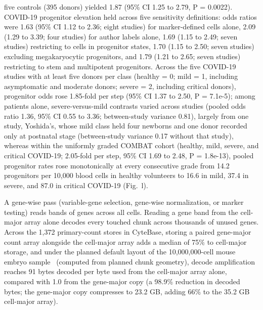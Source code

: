 five controls (395 donors) yielded 1.87 (95\% CI 1.25 to 2.79, P = 0.0022). COVID-19 progenitor elevation held across five sensitivity definitions: odds ratios were 1.63 (95\% CI 1.12 to 2.36; eight studies) for marker-defined cells alone, 2.09 (1.29 to 3.39; four studies) for author labels alone, 1.69 (1.15 to 2.49; seven studies) restricting to cells in progenitor states, 1.70 (1.15 to 2.50; seven studies) excluding megakaryocytic progenitors, and 1.79 (1.21 to 2.65; seven studies) restricting to stem and multipotent progenitors. Across the five COVID-19 studies with at least five donors per class (healthy = 0; mild = 1, including asymptomatic and moderate donors; severe = 2, including critical donors), progenitor odds rose 1.85-fold per step (95\% CI 1.37 to 2.50, P = 7.1e-5); among patients alone, severe-versus-mild contrasts varied across studies (pooled odds ratio 1.36, 95\% CI 0.55 to 3.36; between-study variance 0.81), largely from one study, Yoshida's, whose mild class held four newborns and one donor recorded only at postnatal stage (between-study variance 0.17 without that study), whereas within the uniformly graded COMBAT cohort (healthy, mild, severe, and critical COVID-19; 2.05-fold per step, 95\% CI 1.69 to 2.48, P = 1.8e-13), pooled progenitor rates rose monotonically at every consecutive grade from 14.2 progenitors per 10,000 blood cells in healthy volunteers to 16.6 in mild, 37.4 in severe, and 87.0 in critical COVID-19 (Fig.~l).

\label{note:Count layouts and read requests}

A gene-wise pass (variable-gene selection, gene-wise normalization, or marker testing) reads bands of genes across all cells. Reading a gene band from the cell-major array alone decodes every touched chunk across thousands of unused genes. Across the 1,372 primary-count stores in CyteBase, storing a paired gene-major count array alongside the cell-major array adds a median of 75\% to cell-major storage, and under the planned default layout of the 10,000,000-cell mouse embryo sample~\cite{qiu2024} (computed from planned chunk geometry), decode amplification reaches 91 bytes decoded per byte used from the cell-major array alone, compared with 1.0 from the gene-major copy (a 98.9\% reduction in decoded bytes; the gene-major copy compresses to 23.2 GB, adding 66\% to the 35.2 GB cell-major array).

